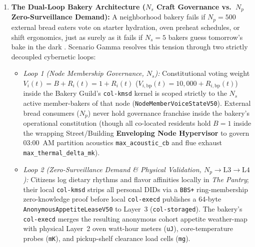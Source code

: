 \begin{enumerate}
    \item \textbf{The Dual-Loop Bakery Architecture ($N_s$ Craft Governance vs.\ $N_p$ Zero-Surveillance Demand):}
    A neighborhood bakery fails if $N_p = 500$ external bread eaters vote on starter hydration, oven
    preheat schedules, or shift ergonomics, just as surely as it fails if $N_s = 5$ bakers guess
    tomorrow's bake in the dark \parencite{ostrom1990}. Scenario Gamma resolves this tension through two
    strictly decoupled cybernetic loops:
    \begin{itemize}
        \item \emph{Loop 1 (Node Membership Governance, $N_s$):} Constitutional voting weight
        $V_i(t) = B + R_i(t) = 1 + R_i(t)$ ($V_{i,\mathrm{bp}}(t) = 10{,}000 + R_{i,\mathrm{bp}}(t)$)
        inside the Bakery Guild's \texttt{col-kmsd} kernel is scoped strictly to the $N_s$ active
        member-bakers of that node (\texttt{NodeMemberVoiceStateV50}). External bread consumers ($N_p$)
        never hold governance franchise inside the bakery's operational constitution (though all co-located
        residents hold $B=1$ inside the wrapping Street/Building \textbf{Enveloping Node Hypervisor} to
        govern 03:00~AM partition acoustics \texttt{max\_acoustic\_cb} and flue exhaust
        \texttt{max\_thermal\_delta\_mk}).
        \item \emph{Loop 2 (Zero-Surveillance Demand \& Physical Validation, $N_p \to \mathrm{L3} \to \mathrm{L4}$):}
        Citizens log dietary rhythms and flavor affinities locally in \emph{The Pantry}; their local
        \texttt{col-kmsd} strips all personal DIDs via a \texttt{BBS+} ring-membership zero-knowledge proof
        \parencite{camenisch2004signature} before local \texttt{col-execd} publishes a 64-byte
        \texttt{AnonymousAppetiteLeaseV50} to Layer~3 (\texttt{col-storaged}). The bakery's
        \texttt{col-execd} merges the resulting anonymous cohort appetite weather-map with physical Layer~2
        oven watt-hour meters (\texttt{uJ}), core-temperature probes (\texttt{mK}), and pickup-shelf
        clearance load cells (\texttt{mg}).
    \end{itemize}


\end{enumerate}
